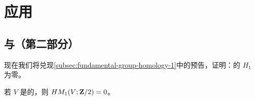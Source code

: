 
\section{应用}
\label{sec:applications}

\subsection{\trFundamentalGroup{}与\trHomology{}（第二部分）}
\label{subsec:fundamental-group-homology-2}

现在我们将兑现\cref{subsec:fundamental-group-homology-1}中的预告，证明：\trSimplyConnected\trManifold{}的 $H_1$ 为零。

\begin{proposition}\label{thm:simply-connected-hm1-zero}
若 $V$ 是\trSimplyConnected{}的，则 $HM_1(V;\mathbf{Z}/2)=0$。
\end{proposition}

